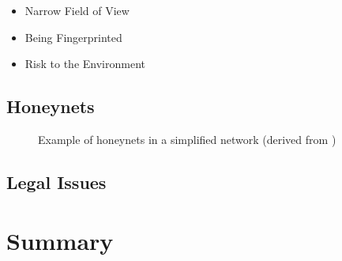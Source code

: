\begin{itemize}
    \item Narrow Field of View
    \item Being Fingerprinted
    \item Risk to the Environment
\end{itemize}

\subsection{Honeynets}

\begin{figure}[h]
    \centering
    
    \caption{Example of honeynets in a simplified network (derived from \cite{Spitzner2003})}
    \label{fig:honeynet-example}
\end{figure}

\cite{Spitzner2003}

\subsection{Legal Issues}

\cite{Spitzner2003}

\section{Summary}

